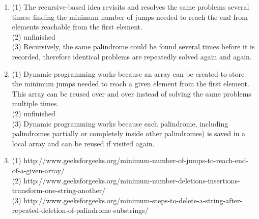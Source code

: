 \documentclass{article}
\begin{document}
\begin{enumerate}
\begin{enumerate}
	(2) unfinished\\
	(3) The main idea is to find all substrings greater than one character in the string that are palindromes, then remove them in such a way so that the entire string is deleted in as little steps 		as possible. The recursive calls would be executed after each palindrome is found, accounting for cases in which parts of some palindromes are included inside other palindromes.
	\item (1) The recursive-based idea revisits and resolves the same problems several times: finding the minimum number of jumps needed to reach the end from elements reachable from the 		first element. \\
	(2) unfinished\\
	(3) Recursively, the same palindrome could be found several times before it is recorded, therefore identical problems are repeatedly solved again and again.
	\item (1) Dynamic programming works because an array can be created to store the minimum jumps needed to reach a given element from the first element. This array can be reused over 		and over instead of solving the same problems multiple times.\\
	(2) unfinished\\
	(3) Dynamic programming works because each palindrome, including palindromes partially or completely inside other palindromes) is saved in a local array and can be reused if visited again.
	\item (1) http://www.geeksforgeeks.org/minimum-number-of-jumps-to-reach-end-of-a-given-array/ \\
	(2) http://www.geeksforgeeks.org/minimum-number-deletions-insertions-transform-one-string-another/ \\
	(3) http://www.geeksforgeeks.org/minimum-steps-to-delete-a-string-after-repeated-deletion-of-palindrome-substrings/
	\end{enumerate}
\end{enumerate}
\end{document}
